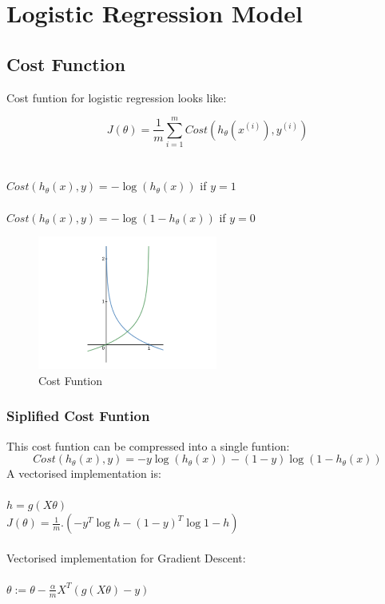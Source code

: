 \documentclass[12pt]{report}
\begin{document}
\section{Logistic Regression Model}

  \subsection{Cost Function}
    Cost funtion for logistic regression looks like:

    \begin{equation}
      J(\theta) = \frac{1}{m}\sum_{i=1}^{m}Cost(h_\theta(x^{(i)}), y^{(i)})
    \end{equation}
    \\ \\
    $ Cost(h_\theta(x),y) = -\log{(h_\theta{(x)})} $ \hfill if $y = 1$
    \\ \\
    $Cost(h_\theta(x),y) = -\log{(1-h_\theta{(x)})}$  \hfill if $y = 0$

    \begin{figure}[h]
      \centering
      \includegraphics[scale = 0.25]{costlog.png}
      \caption{Cost Funtion}
    \end{figure}

    \subsubsection{Siplified Cost Funtion}
    This cost funtion can be compressed into a single funtion:
    \begin{equation}
      Cost(h_\theta(x),y) = -y\log{(h_\theta{(x)})} -(1-y)\log{(1-h_\theta{(x)})}
    \end{equation}
    A vectorised implementation is: \\ \\
    $h = g(X\theta)$\\
    $J(\theta) = \frac{1}{m}.(-y^T\log{h}-(1-y)^T\log{1-h})$
    \\ \\
    Vectorised implementation for Gradient Descent: \\ \\
    $\theta := \theta - \frac{\alpha}{m}X^T(g(X\theta)-y)$
\end{document}
